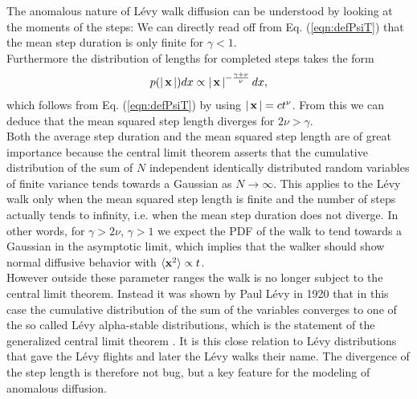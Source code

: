 The anomalous nature of L\'evy walk diffusion can be understood by looking at the moments of the steps: We can directly read off from Eq. (\ref{eqn:defPsiT}) that the mean step duration is only finite for $\gamma<1$.\\ 
Furthermore the distribution of lengths for completed steps takes the form 
%
\begin{align}
p(\left|\,\mathbf{ x }\,\right|) dx \propto \left|\,\mathbf{ x }\,\right|^{-\frac{\gamma+\nu}{\nu}} dx ,
\end{align}
%
which follows from Eq. (\ref{eqn:defPsiT}) by using $\left|\,\mathbf{ x }\,\right| = c t^{\nu}$. From this we can deduce that the mean squared step length diverges for $2\nu > \gamma$. \\
{\color{blue}
Both the average step duration and the mean squared step length are of great importance because the central limit theorem asserts that the cumulative distribution of the sum of $N$ independent identically distributed random variables of finite variance tends towards a Gaussian as $N \to \infty$. This applies to the L\'evy walk only when the mean squared step length is finite and the number of steps actually tends to infinity, i.e. when the mean step duration does not diverge. In other words, for $\gamma > 2 \nu$, $\gamma >1$ we expect the \gls{PDF} of the walk to tend towards a Gaussian in the asymptotic limit, which implies that the walker should show normal diffusive behavior with $\langle \mathbf{ x }^2 \rangle \propto t$. \\
However outside these parameter ranges the walk is no longer subject to the central limit theorem. Instead it was shown by Paul L\'evy in 1920 that in this case the cumulative distribution of the sum of the variables converges to one of the so called L\'evy alpha-stable distributions, which  is the statement of the generalized central limit theorem \cite{lwreview}. 
} 
It is this close relation to L\'evy distributions that gave the L\'evy flights and later the L\'evy walks their name. The divergence of the step length is therefore not bug, but a key feature for the modeling of anomalous diffusion. 

